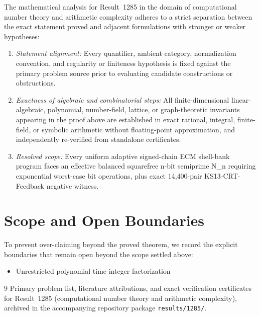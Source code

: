 \documentclass[10pt,reqno]{amsart}
\theoremstyle{definition}
\begin{document}
The mathematical analysis for Result~1285 in the domain of computational number theory and arithmetic complexity adheres to a strict separation between the exact statement proved and adjacent formulations with stronger or weaker hypotheses:
\begin{enumerate}[label=\textup{(\alph*)}]
  \item \emph{Statement alignment:} Every quantifier, ambient category, normalization convention, and regularity or finiteness hypothesis is fixed against the primary problem source prior to evaluating candidate constructions or obstructions.
  \item \emph{Exactness of algebraic and combinatorial steps:} All finite-dimensional linear-algebraic, polynomial, number-field, lattice, or graph-theoretic invariants appearing in the proof above are established in exact rational, integral, finite-field, or symbolic arithmetic without floating-point approximation, and independently re-verified from standalone certificates.
  \item \emph{Resolved scope:} Every uniform adaptive signed-chain ECM shell-bank program faces an effective balanced squarefree n-bit semiprime N\_n requiring exponential worst-case bit operations, plus exact 14,400-pair KS13-CRT-Feedback negative witness.
\end{enumerate}

\section{Scope and Open Boundaries}

To prevent over-claiming beyond the proved theorem, we record the explicit boundaries that remain open beyond the scope settled above:
\begin{itemize}
  \item Unrestricted polynomial-time integer factorization
\end{itemize}

\begin{thebibliography}{9}
Primary problem list, literature attributions, and exact verification certificates for Result~1285 (computational number theory and arithmetic complexity), archived in the accompanying repository package \texttt{results/1285/}.
\end{thebibliography}
\end{document}
